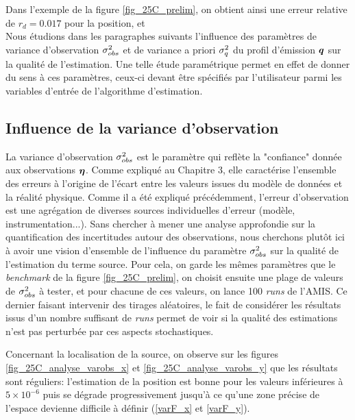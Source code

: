  
 Dans l'exemple de la figure \ref{fig_25C_prelim}, on obtient ainsi une erreur relative de $r_d = 0.017$ pour la position, et \\
 
 Nous étudions dans les paragraphes suivants l'influence des paramètres de variance d'observation ${\sigma_{obs}^2}$ et de variance a priori $\sigma_q^2$ du profil d'émission ${\bm{q}}$ sur la qualité de l'estimation. Une telle étude paramétrique permet en effet de donner du sens à ces paramètres, ceux-ci devant être spécifiés par l'utilisateur parmi les variables d'entrée de l'algorithme d'estimation. 
 
 \subsection{Influence de la variance d'observation}
 
 La variance d'observation ${\sigma_{obs}^2}$ est le paramètre qui reflète la "confiance" donnée aux observations ${\bm{\eta}}$. Comme expliqué au Chapitre 3, elle caractérise l'ensemble des erreurs à l'origine de l'écart entre les valeurs issues du modèle de données et la réalité physique. Comme il a été expliqué précédemment, l'erreur d'observation est une agrégation de diverses sources individuelles d'erreur (modèle, instrumentation...). Sans chercher à mener une analyse approfondie sur la quantification des incertitudes autour des observations, nous cherchons plutôt ici à avoir une vision d'ensemble de l'influence du paramètre ${\sigma_{obs}^2}$ sur la qualité de l'estimation du terme source. Pour cela, on garde les mêmes paramètres que le \textit{benchmark} de la figure \ref{fig_25C_prelim}, on choisit ensuite une plage de valeurs de ${\sigma_{obs}^2}$ à tester, et pour chacune de ces valeurs, on lance 100 \textit{runs} de l'AMIS. Ce dernier faisant intervenir des tirages aléatoires, le fait de considérer les résultats issus d'un nombre suffisant de \textit{runs} permet de voir si la qualité des estimations n'est pas perturbée par ces aspects stochastiques. 
   
         Concernant la localisation de la source, on observe sur les figures \ref{fig_25C_analyse_varobs_x} et \ref{fig_25C_analyse_varobs_y} que les résultats sont réguliers: l'estimation de la position est bonne pour les valeurs inférieures à $5\times 10^{-6}$ puis se dégrade progressivement jusqu'à {ce qu'une zone précise de l'espace devienne difficile à définir} (\ref{varF_x} et \ref{varF_y}).
         
